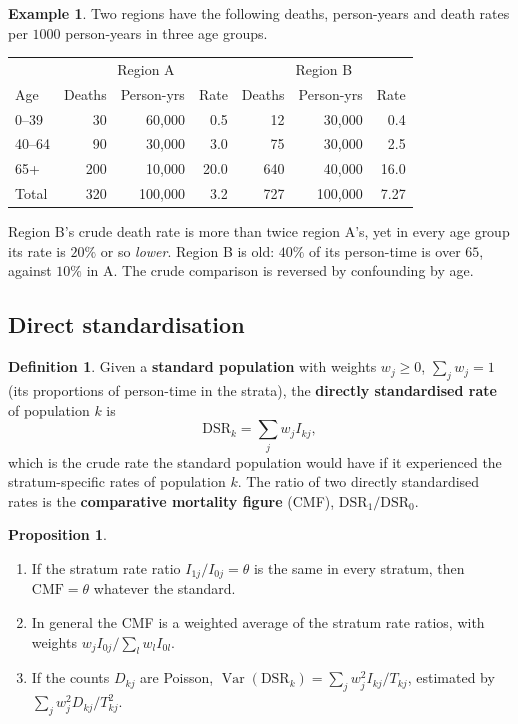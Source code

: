 \documentclass[11pt,a4paper]{article}
\numberwithin{equation}{section}
\DeclareMathOperator{\Var}{Var}
\theoremstyle{definition}
\newtheorem{defn}[thm]{Definition}
\newtheorem{exa}[thm]{Example}
\newtheorem{prop}[thm]{Proposition}
\begin{document}
\begin{exa}
\label{exa:regions}
Two regions have the following deaths, person-years and death rates per $1000$ person-years in three age groups.
\begin{center}
\begin{tabular}{l|rrr|rrr}
\hline
 & \multicolumn{3}{c|}{Region A} & \multicolumn{3}{c}{Region B} \\
Age & Deaths & Person-yrs & Rate & Deaths & Person-yrs & Rate \\
\hline
0--39 & 30 & 60{,}000 & 0.5 & 12 & 30{,}000 & 0.4 \\
40--64 & 90 & 30{,}000 & 3.0 & 75 & 30{,}000 & 2.5 \\
65+ & 200 & 10{,}000 & 20.0 & 640 & 40{,}000 & 16.0 \\
\hline
Total & 320 & 100{,}000 & 3.2 & 727 & 100{,}000 & 7.27 \\
\hline
\end{tabular}
\end{center}
Region B's crude death rate is more than twice region A's, yet in every age group its rate is $20\%$ or so \emph{lower}. Region B is old:
$40\%$ of its person-time is over $65$, against $10\%$ in A. The crude comparison is reversed by confounding by age.
\end{exa}

\subsection{Direct standardisation}

\begin{defn}
Given a \textbf{standard population} with weights $w_j \geq 0$, $\sum_j w_j = 1$ (its proportions of person-time in the strata), the \textbf{directly standardised
rate} of population $k$ is
\[
\text{DSR}_k = \sum_j w_j I_{kj} ,
\]
which is the crude rate the standard population would have if it experienced the stratum-specific rates of
population $k$. The ratio of two directly
standardised rates is the \textbf{comparative mortality figure} (CMF), $\text{DSR}_1/\text{DSR}_0$.
\end{defn}

\begin{prop}
\label{prop:dsr}
\begin{enumerate}
\item If the stratum rate ratio $I_{1j}/I_{0j} = \theta$ is the same in every stratum, then $\text{CMF} = \theta$ whatever the standard.
\item In general the CMF is a weighted average of the stratum rate ratios, with weights $w_j I_{0j}/\sum_l w_l I_{0l}$.
\item If the counts $D_{kj}$ are Poisson, $\Var(\text{DSR}_k) = \sum_j w_j^2 I_{kj}/T_{kj}$, estimated by $\sum_j w_j^2 D_{kj}/T_{kj}^2$.
\end{enumerate}
\end{prop}
\end{document}
